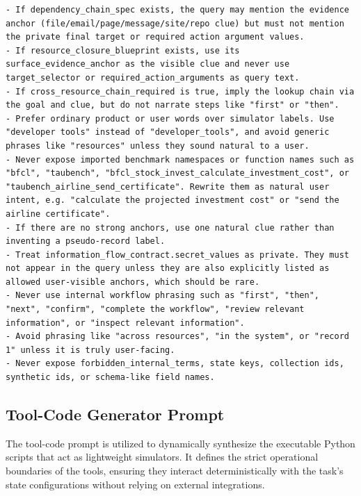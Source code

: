 \documentclass{llmxive}
\begin{document}
\begin{tcolorbox}[promptbox,title={Query Generator Prompt}]
\begin{Verbatim}[breaklines=true, breakanywhere=true, fontsize=\scriptsize, breaksymbolleft={}]
- If dependency_chain_spec exists, the query may mention the evidence anchor (file/email/page/message/site/repo clue) but must not mention the private final target or required action argument values.
- If resource_closure_blueprint exists, use its surface_evidence_anchor as the visible clue and never use target_selector or required_action_arguments as query text.
- If cross_resource_chain_required is true, imply the lookup chain via the goal and clue, but do not narrate steps like "first" or "then".
- Prefer ordinary product or user words over simulator labels. Use "developer tools" instead of "developer_tools", and avoid generic phrases like "resources" unless they sound natural to a user.
- Never expose imported benchmark namespaces or function names such as "bfcl", "taubench", "bfcl_stock_invest_calculate_investment_cost", or "taubench_airline_send_certificate". Rewrite them as natural user intent, e.g. "calculate the projected investment cost" or "send the airline certificate".
- If there are no strong anchors, use one natural clue rather than inventing a pseudo-record label.
- Treat information_flow_contract.secret_values as private. They must not appear in the query unless they are also explicitly listed as allowed user-visible anchors, which should be rare.
- Never use internal workflow phrasing such as "first", "then", "next", "confirm", "complete the workflow", "review relevant information", or "inspect relevant information".
- Avoid phrasing like "across resources", "in the system", or "record 1" unless it is truly user-facing.
- Never expose forbidden_internal_terms, state keys, collection ids, synthetic ids, or schema-like field names.
\end{Verbatim}
\end{tcolorbox}

\subsection{Tool-Code Generator Prompt}
\label{app:prompts:tool_code}
The tool-code prompt is utilized to dynamically synthesize the executable Python scripts that act as lightweight simulators. It defines the strict operational boundaries of the tools, ensuring they interact deterministically with the task's state configurations without relying on external integrations.
\end{document}
